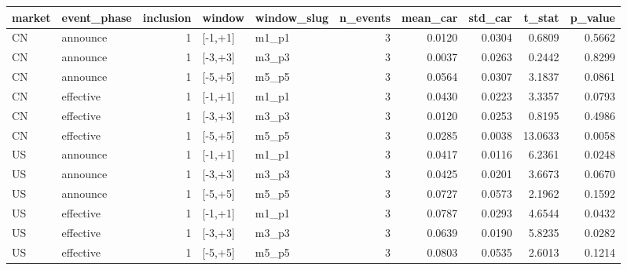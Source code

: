 \begin{tabular}{llrllrrrrr}
\toprule
market & event_phase & inclusion & window & window_slug & n_events & mean_car & std_car & t_stat & p_value \\
\midrule
CN & announce & 1 & [-1,+1] & m1_p1 & 3 & 0.0120 & 0.0304 & 0.6809 & 0.5662 \\
CN & announce & 1 & [-3,+3] & m3_p3 & 3 & 0.0037 & 0.0263 & 0.2442 & 0.8299 \\
CN & announce & 1 & [-5,+5] & m5_p5 & 3 & 0.0564 & 0.0307 & 3.1837 & 0.0861 \\
CN & effective & 1 & [-1,+1] & m1_p1 & 3 & 0.0430 & 0.0223 & 3.3357 & 0.0793 \\
CN & effective & 1 & [-3,+3] & m3_p3 & 3 & 0.0120 & 0.0253 & 0.8195 & 0.4986 \\
CN & effective & 1 & [-5,+5] & m5_p5 & 3 & 0.0285 & 0.0038 & 13.0633 & 0.0058 \\
US & announce & 1 & [-1,+1] & m1_p1 & 3 & 0.0417 & 0.0116 & 6.2361 & 0.0248 \\
US & announce & 1 & [-3,+3] & m3_p3 & 3 & 0.0425 & 0.0201 & 3.6673 & 0.0670 \\
US & announce & 1 & [-5,+5] & m5_p5 & 3 & 0.0727 & 0.0573 & 2.1962 & 0.1592 \\
US & effective & 1 & [-1,+1] & m1_p1 & 3 & 0.0787 & 0.0293 & 4.6544 & 0.0432 \\
US & effective & 1 & [-3,+3] & m3_p3 & 3 & 0.0639 & 0.0190 & 5.8235 & 0.0282 \\
US & effective & 1 & [-5,+5] & m5_p5 & 3 & 0.0803 & 0.0535 & 2.6013 & 0.1214 \\
\bottomrule
\end{tabular}
